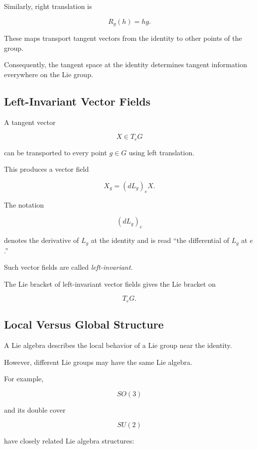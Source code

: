 Similarly, right translation is

\[ R_g(h)=hg. \]

These maps transport tangent vectors from the identity to other points of
the group.

Consequently, the tangent space at the identity determines tangent
information everywhere on the Lie group.

\subsection{Left-Invariant Vector Fields}
\label{subsec:left-invariant-vector-fields}

A tangent vector

\[ X\in T_eG \]

can be transported to every point \(g\in G\) using left translation.

This produces a vector field

\[ X_g=(dL_g)_eX. \]

The notation

\[ (dL_g)_e \]

denotes the derivative of \(L_g\) at the identity and is read
``the differential of \(L_g\) at \(e\).''

Such vector fields are called \emph{left-invariant}.

The Lie bracket of left-invariant vector fields gives the Lie bracket on

\[ T_eG. \]

\subsection{Local Versus Global Structure}
\label{subsec:local-global-lie}

A Lie algebra describes the local behavior of a Lie group near the identity.

However, different Lie groups may have the same Lie algebra.

For example,

\[ SO(3) \]

and its double cover

\[ SU(2) \]

have closely related Lie algebra structures:

